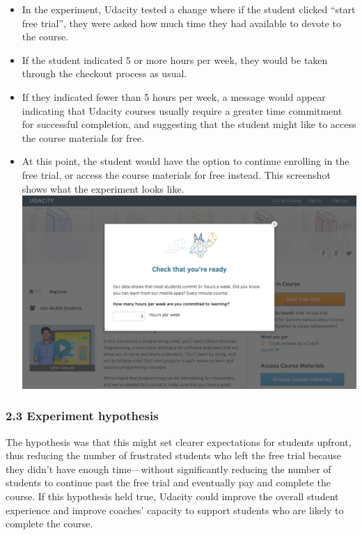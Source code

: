 \documentclass[11pt]{article}
\providecommand{\tightlist}{%
      \setlength{\itemsep}{0pt}\setlength{\parskip}{0pt}}
\begin{document}
\begin{itemize}
\tightlist
\item
  In the experiment, Udacity tested a change where if the student
  clicked ``start free trial'', they were asked how much time they had
  available to devote to the course.
\item
  If the student indicated 5 or more hours per week, they would be taken
  through the checkout process as usual.
\item
  If they indicated fewer than 5 hours per week, a message would appear
  indicating that Udacity courses usually require a greater time
  commitment for successful completion, and suggesting that the student
  might like to access the course materials for free.
\item
  At this point, the student would have the option to continue enrolling
  in the free trial, or access the course materials for free instead.
  This screenshot shows what the experiment looks like.
  \includegraphics{Experiment.png}
\end{itemize}

    \hypertarget{experiment-hypothesis}{%
\subsubsection{2.3 Experiment hypothesis}\label{experiment-hypothesis}}

The hypothesis was that this might set clearer expectations for students
upfront, thus reducing the number of frustrated students who left the
free trial because they didn't have enough time---without significantly
reducing the number of students to continue past the free trial and
eventually pay and complete the course. If this hypothesis held true,
Udacity could improve the overall student experience and improve
coaches' capacity to support students who are likely to complete the
course.
\end{document}
